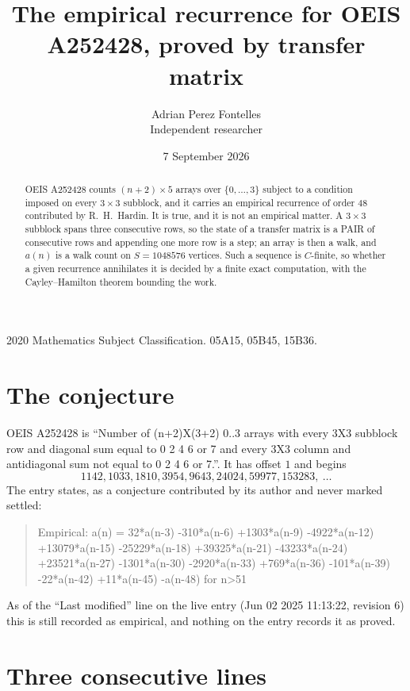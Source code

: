 \documentclass[11pt,a4paper]{article}
\title{The empirical recurrence for OEIS A252428, proved by transfer matrix}
\author{Adrian Perez Fontelles\\ \small Independent researcher}
\date{7 September 2026}
\theoremstyle{plain}
\theoremstyle{definition}
\begin{document}
\maketitle

\begin{abstract}
OEIS A252428 counts $(n+2)\times5$ arrays over $\{0,\dots,3\}$ subject to a condition imposed on
every $3\times3$ subblock, and it carries an empirical recurrence of order $48$
contributed by R.~H.~Hardin. It is true, and it is not an empirical matter. A $3\times3$
subblock spans three consecutive rows, so the state of a transfer matrix is a PAIR of
consecutive rows and appending one more row is a step; an array is then a walk, and
$a(n)$ is a walk count on $S=1048576$ vertices. Such a sequence is $C$-finite, so whether a given
recurrence annihilates it is decided by a finite exact computation, with the Cayley--Hamilton
theorem bounding the work.
\end{abstract}

\noindent\small 2020 Mathematics Subject Classification. 05A15, 05B45, 15B36.\normalsize

\section{The conjecture}

OEIS A252428 is ``Number of (n+2)X(3+2) 0..3 arrays with every 3X3 subblock row and diagonal sum equal to 0 2 4 6 or 7 and every 3X3 column and antidiagonal sum not equal to 0 2 4 6 or 7.''. It has offset $1$ and begins
\[
1142, 1033, 1810, 3954, 9643, 24024, 59977, 153283,\ \dots
\]
The entry states, as a conjecture contributed by its author and never marked settled:
\begin{quote}
Empirical: a(n) = 32*a(n-3) -310*a(n-6) +1303*a(n-9) -4922*a(n-12) +13079*a(n-15) -25229*a(n-18) +39325*a(n-21) -43233*a(n-24) +23521*a(n-27) -1301*a(n-30) -2920*a(n-33) +769*a(n-36) -101*a(n-39) -22*a(n-42) +11*a(n-45) -a(n-48) for n>51
\end{quote}
As of the ``Last modified'' line on the live entry (Jun 02 2025 11:13:22, revision 6) this is still
recorded as empirical, and nothing on the entry records it as proved.

\section{Three consecutive lines}
\end{document}
